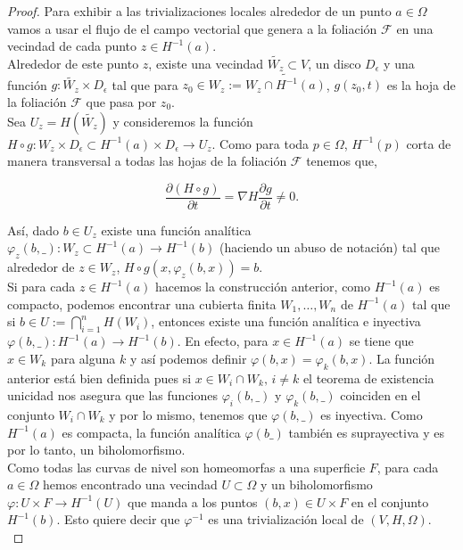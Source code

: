 \begin{proof}
Para exhibir a las trivializaciones locales alrededor de un punto $a\in \Omega$ vamos a usar el flujo de el campo vectorial que genera a la foliación $\mathcal{F}$ en una vecindad de cada punto $z\in H^{-1}(a)$.\\
Alrededor de este punto $z$, existe una vecindad $\tilde{W_{z}}\subset V$, un disco $D_{\epsilon}$ y una función $g\colon \tilde{W_{z}}\times D_{\epsilon}$ tal que para $z_{0}\in W_{z}:=\tilde{W_{z}\cap H^{-1}(a)}$, $g(z_{0},t)$ es la hoja de la foliación $\mathcal{F}$ que pasa por $z_{0}$.\\
Sea $U_{z}=H(\tilde{W_{z}})$ y consideremos la función $H\circ g\colon W_{z}\times D_{\epsilon}\subset H^{-1}(a)\times D_{\epsilon}\rightarrow U_{z}$. Como  para toda $p\in\Omega$, $H^{-1}(p)$ corta de manera transversal a todas las hojas de la foliación $\mathcal{F}$ tenemos que,

$$\frac{\partial (H\circ g)}{\partial t}=\nabla H\frac{\partial g}{\partial t}\neq 0.$$

Así, dado $b\in U_{z}$ existe una función analítica $\varphi_{z}(b,\_)\colon W_{z}\subset H^{-1}(a)\rightarrow H^{-1}(b)$ (haciendo un abuso de notación) tal que alrededor de $z\in W_{z}$, $H\circ g(x,\varphi_{z}(b,x))=b$.\\

Si para cada $z\in H^{-1}(a)$ hacemos la construcción anterior, como $H^{-1}(a)$ es compacto, podemos encontrar una cubierta finita $W_{1},\ldots,W_{n}$ de $H^{-1}(a)$ tal que si $b\in U:=\bigcap_{i=1}^{n} H(W_{i})$, entonces existe una función analítica e inyectiva $\varphi(b,\_)\colon H^{-1}(a)\rightarrow H^{-1}(b)$. En efecto, para $x\in H^{-1}(a)$ se tiene que $x\in W_{k}$ para alguna $k$ y así podemos definir $\varphi(b,x)=\varphi_{k}(b,x)$. La función anterior está bien definida pues si $x\in W_{i}\cap W_{k},\, i\neq k$ el teorema de existencia unicidad nos asegura que las funciones $\varphi_{i}(b,\_)$ y $\varphi_{k}(b,\_)$ coinciden en el conjunto $W_{i}\cap W_{k}$ y por lo mismo, tenemos que $\varphi(b,\_)$ es inyectiva. Como $H^{-1}(a)$ es compacta, la función analítica $\varphi(b\_)$ también es suprayectiva y es por lo tanto, un biholomorfismo.\\


Como todas las curvas de nivel son homeomorfas a una superficie $F$, para cada $a\in\Omega$ hemos encontrado una vecindad $U\subset\Omega$ y un biholomorfismo $\varphi\colon U\times F\rightarrow H^{-1}(U)$ que manda a los puntos $(b,x)\in U\times F$ en el conjunto $H^{-1}(b)$. Esto quiere decir que $\varphi^{-1}$ es una trivialización local de $(V,H,\Omega)$.\\
\end{proof}

